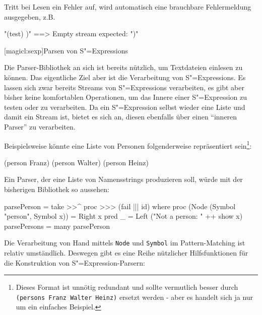 \documentclass[a4paper, bibgerm]{book}
\newcommand\icode[1]{\lstinline?#1?}
\newcommand\lsection{}
\newcommand{\sexp}{S"=Expression}
\newcommand{\sexps}{S"=Expressions}
\begin{document}
Tritt bei Lesen ein Fehler auf, wird automatisch eine brauchbare Fehlermeldung
ausgegeben, z.B.

\begin{code}
"(test) )"  ==>  Empty stream expected: ")"  
\end{code}

\lsection[magicl:sexp]{Parsen von \sexps{}}

Die Parser-Bibliothek an sich ist bereits nützlich, um Textdateien
einlesen zu können. Das eigentliche Ziel aber ist die Verarbeitung von
\sexps{}. Es lassen sich zwar bereits Streams von \sexps{} verarbeiten,
es gibt aber bisher keine komfortablen Operationen, um das Innere einer
\sexp{} zu testen oder zu verarbeiten. Da ein \sexp{} selbst wieder eine
Liste und damit ein Stream ist, bietet es sich an, diesen ebenfalls über
einen "`inneren Parser"' zu verarbeiten.

Beispielsweise könnte eine Liste von Personen folgenderweise
repräsentiert sein\footnote{Dieses Format ist unnötig redundant und
  sollte vermutlich besser durch \icode{(persons Franz Walter Heinz)} ersetzt
  werden - aber es handelt sich ja nur um ein einfaches Beispiel.}:
\begin{code}
(person Franz)
(person Walter)  
(person Heinz)
\end{code}

Ein Parser, der eine Liste von Namensstrings produzieren soll, würde mit
der bisherigen Bibliothek so aussehen:

\begin{code}
parsePerson = take >>^ proc >>> (fail ||| id)
  where proc (Node (Symbol "person", Symbol x)) = Right x
        pred _ = Left ("Not a person: " ++ show x)
parsePersons = many parsePerson
\end{code} %

Die Verarbeitung von Hand mittels \icode{Node} und \icode{Symbol} im
Pattern-Matching ist relativ umständlich. Deswegen gibt es eine Reihe
nützlicher Hilfsfunktionen für die Konstruktion von \sexp{}-Parsern:
\end{document}
